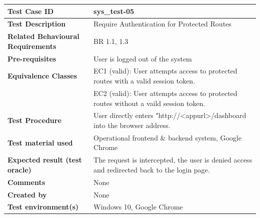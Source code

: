 
\begin{table}[h]
\small
\renewcommand{\arraystretch}{1.1}
\begin{tabularx}{\linewidth}{>{\bfseries}l X}
\hline
Test Case ID & sys\_test-05 \\ \hline
Test Description & Require Authentication for Protected Routes \\ \hline
Related Behavioural Requirements & BR 1.1, 1.3 \\ \hline
Pre-requisites & User is logged out of the system \\ \hline
Equivalence Classes & EC1 (valid): User attempts access to protected routes with a valid session token. \\ & EC2 (valid): User attempts access to protected routes without a vaild session token. \\ \hline
Test Procedure & User directly enters "http://<appurl>/dashboard into the browser address. \\ \hline
Test material used & Operational frontend \& backend system, Google Chrome \\ \hline
Expected result (test oracle) & The request is intercepted, the user is denied access and redirected back to the login page. \\ \hline
Comments & None \\ \hline
Created by & None \\ \hline
Test environment(s) & Windows 10, Google Chrome \\ \hline
\end{tabularx}
\end{table}

